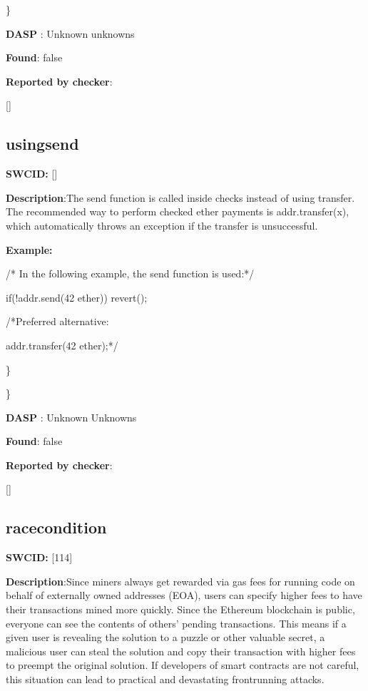 \documentclass{article}
\begin{document}
\} 

\textbf{DASP} : Unknown unknowns

\textbf{Found}: false

\textbf{Reported by checker}: 
\begin{ffcode} 

[]
\end{ffcode} 
\subsection{using{\textunderscore}send} 
\textbf{SWC{\textunderscore}ID:} []

\textbf{Description}:The send function is called inside checks instead of using transfer. The recommended way to perform checked ether payments is addr.transfer(x), which automatically throws an exception if the transfer is unsuccessful.


\textbf{Example:} 
\begin{ffcode} 

/* In the following example, the send function is used:*/ 


if(!addr.send(42 ether)) {
    revert();
}

 /*Preferred alternative:

addr.transfer(42 ether);*/ 

\end{ffcode} 
\} 

\} 

\textbf{DASP} : Unknown Unknowns

\textbf{Found}: false

\textbf{Reported by checker}: 
\begin{ffcode} 

[]
\end{ffcode} 
\subsection{race{\textunderscore}condition} 
\textbf{SWC{\textunderscore}ID:} [114]

\textbf{Description}:Since miners always get rewarded via gas fees for running code on behalf of externally owned addresses (EOA), users can specify higher fees to have their transactions mined more quickly. Since the Ethereum blockchain is public, everyone can see the contents of others' pending transactions. This means if a given user is revealing the solution to a puzzle or other valuable secret, a malicious user can steal the solution and copy their transaction with higher fees to preempt the original solution. If developers of smart contracts are not careful, this situation can lead to practical and devastating front{\textendash}running attacks.
\end{document}
